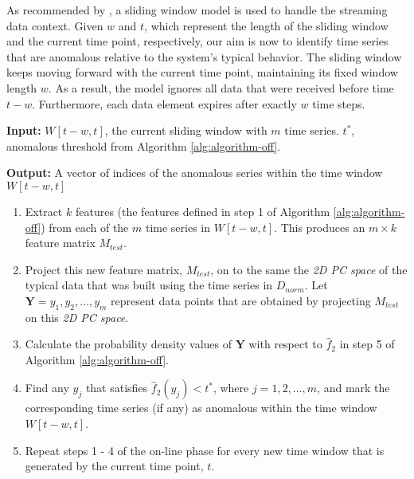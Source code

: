 \documentclass[12pt]{article}
\begin{document}
As recommended by \citet{jin2007frequent}, a sliding window model is
used to handle the streaming data context. Given \(w\) and \(t\), which
represent the length of the sliding window and the current time point,
respectively, our aim is now to identify time series that are anomalous
relative to the system's typical behavior. The sliding window keeps
moving forward with the current time point, maintaining its fixed window
length \(w\). As a result, the model ignores all data that were received
before time \(t-w\). Furthermore, each data element expires after
exactly \(w\) time steps.

\begin{algo} {\label{alg:algorithm-on}}
\end{algo}
\vspace{-0.5em}

\textbf{Input:} \(W[t-w,t]\), the current sliding window with \(m\) time
series. \(t^{*}\), anomalous threshold from Algorithm
\ref{alg:algorithm-off}.

\textbf{Output:} A vector of indices of the anomalous series within the
time window \(W[t-w,t]\)

\vspace{-0.5em}

\begin{enumerate}
\def\labelenumi{\arabic{enumi}.}
\item
  Extract \(k\) features (the features defined in step 1 of Algorithm
  \ref{alg:algorithm-off}) from each of the \(m\) time series in
  \(W[t-w,t]\). This produces an \(m\times k\) feature matrix
  \(M_{test}\).
\item
  Project this new feature matrix, \(M_{test}\), on to the same the
  \emph{2D PC space} of the typical data that was built using the time
  series in \(D_{norm}\). Let \(\bm{Y} = y_{1}, y_{2},\dots,y_{m}\)
  represent data points that are obtained by projecting \(M_{test}\) on
  this \emph{2D PC space}.
\item
  Calculate the probability density values of \(\bm{Y}\) with respect to
  \(\hat{f}_{2}\) in step 5 of Algorithm \ref{alg:algorithm-off}.
\item
  Find any \(y_{j}\) that satisfies \(\hat{f}_{2}(y_{j}) < t^{*}\),
  where \(j=1,2,\dots,m\), and mark the corresponding time series (if
  any) as anomalous within the time window \(W[t-w,t]\).
\item
  Repeat steps 1 - 4 of the on-line phase for every new time window that
  is generated by the current time point, \(t\).
\end{enumerate}
\end{document}
